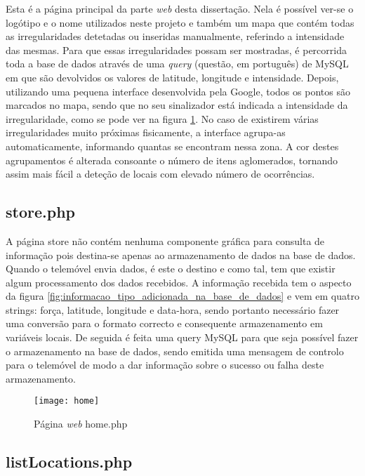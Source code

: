 Esta é a página principal da parte \emph{web} desta dissertação.
Nela é possível ver-se o logótipo e o nome utilizados neste projeto e também um mapa que contém todas as irregularidades detetadas ou inseridas manualmente, referindo a intensidade das mesmas.
Para que essas irregularidades possam ser mostradas, é percorrida toda a base de dados através de uma \emph{query} (questão, em português) de MySQL em que são devolvidos os valores de latitude, longitude e intensidade.
Depois, utilizando uma pequena interface desenvolvida pela Google, todos os pontos são marcados no mapa, sendo que no seu sinalizador está indicada a intensidade da irregularidade, como se pode ver na figura \ref{fig:home.php}.
No caso de existirem várias irregularidades muito próximas fisicamente, a interface agrupa-as automaticamente, informando quantas se encontram nessa zona.
A cor destes agrupamentos é alterada consoante o número de itens aglomerados, tornando assim mais fácil a deteção de locais com elevado número de ocorrências.

\subsection{store.php}
\label{sub:store.php}

A página store não contém nenhuma componente gráfica para consulta de informação pois destina-se apenas ao armazenamento de dados na base de dados.
Quando o telemóvel envia dados, é este o destino e como tal, tem que existir algum processamento dos dados recebidos.
A informação recebida tem o aspecto da figura \ref{fig:informacao_tipo_adicionada_na_base_de_dados} e vem em quatro strings: força, latitude, longitude e data-hora, sendo portanto necessário fazer uma conversão para o formato correcto e consequente armazenamento em variáveis locais.
De seguida é feita uma query MySQL para que seja possível fazer o armazenamento na base de dados, sendo emitida uma mensagem de controlo para o telemóvel de modo a dar informação sobre o sucesso ou falha deste armazenamento.

\begin{figure}[htp]
	\centering
	\texttt{[image: home]}
	\caption{Página \emph{web} home.php}
	\label{fig:home.php}
\end{figure}

\subsection{listLocations.php}
\label{sub:listlocations.php}

